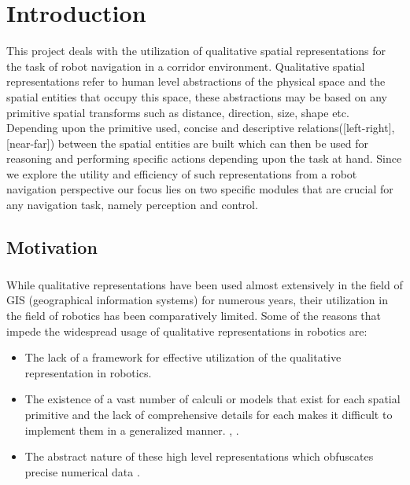 
\chapter{Introduction}
This project deals with the utilization of qualitative spatial representations for the task of robot navigation in a corridor environment. Qualitative spatial representations refer to human level abstractions \cite{cohn2008qualitative} of the physical space and the spatial entities that occupy this space, these abstractions may be based on any primitive spatial transforms such as distance, direction, size, shape etc. Depending upon the primitive used, concise and descriptive relations([left-right],[near-far]) between the spatial entities are built which can then be used for reasoning and performing specific actions depending upon the task at hand.
Since we explore the utility and efficiency of such representations from a robot navigation perspective our focus lies on two specific modules that are crucial for any navigation task, namely perception and control. 


\section{Motivation}
\paragraph{}While qualitative representations have been used almost extensively in the field of GIS (geographical information systems) \cite{van2006qualitative}for numerous years, their utilization in the field of robotics has been comparatively limited. Some of the reasons that impede the widespread usage of qualitative representations in robotics are: 
\begin{itemize}
	\item The lack of a framework for effective utilization of the qualitative representation in robotics.
	
	\item The existence of a vast number of calculi or models that exist for each spatial primitive and the lack of comprehensive details for each makes it difficult to implement them in a generalized manner. \cite{cohn2001qualitative}, \cite{chen2015survey}.
	
	\item The abstract nature of these high level representations which obfuscates precise numerical data \cite{musto1999qualitative}.
\end{itemize}

